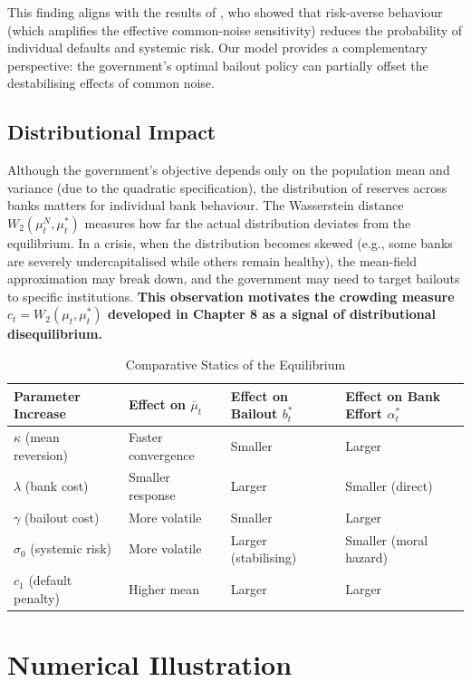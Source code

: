 This finding aligns with the results of \citep{renfiroozi2024}, who showed that
risk-averse behaviour (which amplifies the effective common-noise sensitivity)
reduces the probability of individual defaults and systemic risk. Our model provides
a complementary perspective: the government's optimal bailout policy can partially
offset the destabilising effects of common noise.

\subsection{Distributional Impact}

Although the government's objective depends only on the population mean and
variance (due to the quadratic specification), the distribution of reserves across
banks matters for individual bank behaviour. The Wasserstein distance
$W_2(\mu_t^N, \mu_t^*)$ measures how far the actual distribution deviates from the
equilibrium. In a crisis, when the distribution becomes skewed (e.g., some banks are
severely undercapitalised while others remain healthy), the mean-field
approximation may break down, and the government may need to target bailouts to
specific institutions. \textbf{This observation motivates the crowding measure
$c_t = W_2(\mu_t, \mu_t^*)$ developed in Chapter 8 as a signal of distributional
disequilibrium.}

\begin{table}[ht]
\centering
\small
\caption{Comparative Statics of the Equilibrium}
\label{tab:sr-comparative-statics}
\begin{tabular}{p{2.3cm}p{2.6cm}p{2.3cm}p{3cm}}
\toprule
\textbf{Parameter Increase} & \textbf{Effect on $\bar\mu_t$} & \textbf{Effect on
    Bailout $b_t^*$} & \textbf{Effect on Bank Effort $\alpha_t^*$} \\
\midrule
$\kappa$ (mean reversion) & Faster convergence & Smaller & Larger \\
$\lambda$ (bank cost) & Smaller response & Larger & Smaller (direct) \\
$\gamma$ (bailout cost) & More volatile & Smaller & Larger \\
$\sigma_0$ (systemic risk) & More volatile & Larger (stabilising) & Smaller (moral
    hazard) \\
$c_1$ (default penalty) & Higher mean & Larger & Larger \\
\bottomrule
\end{tabular}
\end{table}


\section{Numerical Illustration}
\label{sec:sr-numerical}

